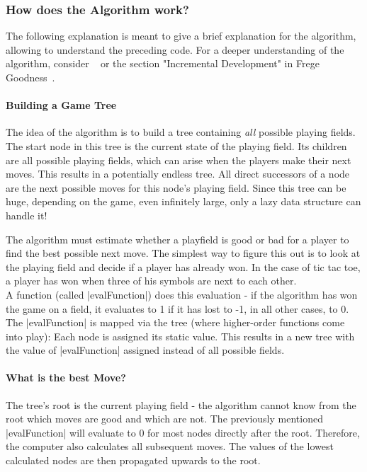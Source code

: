 \subsubsection{How does the Algorithm work?} %
\label{subsub:How does the Algorithm work?}
The following explanation is meant to give a brief explanation for the
algorithm, allowing to understand the preceding code. For a deeper
understanding of the algorithm, consider ~\cite[Ch. 5]{hughes_why_1989} or the
section "Incremental Development" in Frege Goodness~\cite{frege_goodness}.

\paragraph{Building a Game Tree} The idea of the algorithm is to build a tree
containing \textit{all} possible playing fields. The start node in this
tree is the current state of the playing field. Its children are all possible
playing fields, which can arise when the players make their next moves. This
results in a potentially endless tree. All direct successors of a node are the
next possible moves for this node's playing field. Since this tree can be huge,
depending on the game, even infinitely large, only a lazy data structure can
handle it!

The algorithm must estimate whether a playfield is good or bad for a player to
find the best possible next move. The simplest way to figure this out is to
look at the playing field and decide if a player has already won. In the case
of tic tac toe, a player has won when three of his symbols are next to each
other. \\
A function (called |evalFunction|) does this evaluation - if the algorithm has
won the game on a field, it evaluates to 1 if it has lost to -1, in all other
cases, to 0.\\
The |evalFunction| is mapped via the tree (where higher-order functions come into
play): Each node is assigned its static value. This results in a new tree with
the value of |evalFunction| assigned instead of all possible fields.\\


\paragraph{What is the best Move?}
The tree's root is the current playing field - the algorithm cannot know from
the root which moves are good and which are not. The previously mentioned
|evalFunction| will evaluate to 0 for most nodes directly after the root.
Therefore, the computer also calculates all subsequent moves. The values of the
lowest calculated nodes are then propagated upwards to the root. 

